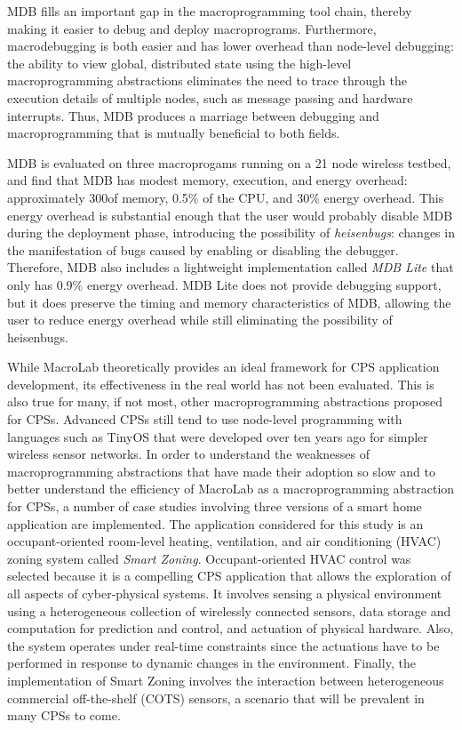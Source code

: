 MDB fills an important gap in the macroprogramming tool chain, thereby making it
easier to debug and deploy macroprograms.  Furthermore, macrodebugging is both
easier and has lower overhead than node-level debugging: the ability to view
global, distributed state using the high-level macroprogramming abstractions
eliminates the need to trace through the execution details of multiple nodes,
such as message passing and hardware interrupts.  Thus, MDB produces a marriage
between debugging and macroprogramming that is mutually beneficial to both
fields.

MDB is evaluated on three macroprogams running on a 21 node wireless testbed,
and find that MDB has modest memory, execution, and energy overhead:
approximately 300\byte of memory, 0.5\% of the CPU, and 30\% energy overhead.
This energy overhead is substantial enough that the user would probably disable
MDB during the deployment phase, introducing the possibility of
\emph{heisenbugs}: changes in the manifestation of bugs caused by enabling or
disabling the debugger.  Therefore, MDB also includes a lightweight
implementation called \emph{MDB Lite} that only has 0.9\% energy overhead.  MDB
Lite does not provide debugging support, but it does preserve the timing and
memory characteristics of MDB, allowing the user to reduce energy overhead while
still eliminating the possibility of heisenbugs.

While MacroLab theoretically provides an ideal framework for CPS application
development, its effectiveness in the real world has not been evaluated. This is
also true for many, if not most, other macroprogramming abstractions proposed
for CPSs. Advanced CPSs still tend to use node-level programming with languages
such as TinyOS that were developed over ten years ago for simpler wireless
sensor networks. In order to understand the weaknesses of macroprogramming
abstractions that have made their adoption so slow and to better understand the
efficiency of MacroLab as a macroprogramming abstraction for CPSs, a number of
case studies involving three versions of a smart home application are
implemented. The application considered for this study is an occupant-oriented
room-level heating, ventilation, and air conditioning (HVAC) zoning system
called {\em Smart Zoning}. Occupant-oriented HVAC control was selected because
it is a compelling CPS application that allows the exploration of all aspects of
cyber-physical systems. It involves sensing a physical environment using a
heterogeneous collection of wirelessly connected sensors, data storage and
computation for prediction and control, and actuation of physical
hardware. Also, the system operates under real-time constraints since the
actuations have to be performed in response to dynamic changes in the
environment. Finally, the implementation of Smart Zoning involves the
interaction between heterogeneous commercial off-the-shelf (COTS) sensors, a
scenario that will be prevalent in many CPSs to come.

